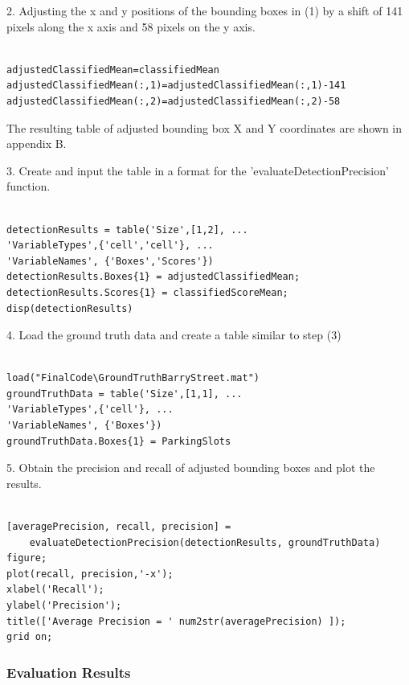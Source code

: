 \documentclass[man]{apa7}
\begin{document}
2. Adjusting the x and y positions of the bounding boxes in (1) by a shift of 141 pixels along the x axis and 58 pixels on the y axis.

\begin{lstlisting}[]

adjustedClassifiedMean=classifiedMean
adjustedClassifiedMean(:,1)=adjustedClassifiedMean(:,1)-141
adjustedClassifiedMean(:,2)=adjustedClassifiedMean(:,2)-58

\end{lstlisting}

The resulting table of adjusted bounding box X and Y coordinates are shown in appendix B. \newline

\newpage

3. Create and input the table in a format for the 'evaluateDetectionPrecision' function.

\begin{lstlisting}[]

detectionResults = table('Size',[1,2], ...
'VariableTypes',{'cell','cell'}, ...
'VariableNames', {'Boxes','Scores'})
detectionResults.Boxes{1} = adjustedClassifiedMean;
detectionResults.Scores{1} = classifiedScoreMean;
disp(detectionResults)

\end{lstlisting}


4. Load the ground truth data and create a table similar to step (3)

\begin{lstlisting}[]

load("FinalCode\GroundTruthBarryStreet.mat")
groundTruthData = table('Size',[1,1], ...
'VariableTypes',{'cell'}, ...
'VariableNames', {'Boxes'})
groundTruthData.Boxes{1} = ParkingSlots

\end{lstlisting}

5. Obtain the precision and recall of adjusted bounding boxes and plot the results.

\begin{lstlisting}[]

[averagePrecision, recall, precision] = 
    evaluateDetectionPrecision(detectionResults, groundTruthData)
figure;
plot(recall, precision,'-x');
xlabel('Recall');
ylabel('Precision');
title(['Average Precision = ' num2str(averagePrecision) ]);
grid on;

\end{lstlisting}

\subsubsection{Evaluation Results}
\end{document}

